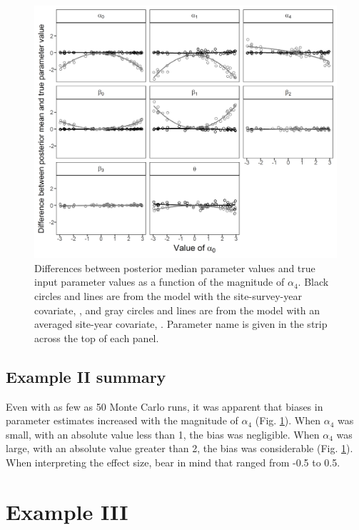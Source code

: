 \documentclass[codesnippet]{jss}
\begin{document}
\begin{figure}
\includegraphics[width=\linewidth]{fig2.png}
\caption{Differences between posterior median parameter values and true input parameter values as a function of the magnitude of $\alpha_4$. Black circles and lines are from the model with the site-survey-year covariate, , and gray circles and lines are from the model with an averaged site-year covariate, . Parameter name is given in the strip across the top of each panel.}
\label{fig:fig2}
\end{figure}

\subsection[Example II summary]{Example II summary}
Even with as few as 50 Monte Carlo runs, it was apparent that biases in parameter estimates increased with the magnitude of $\alpha_4$ (Fig. \ref{fig:fig2}). When $\alpha_4$ was small, with an absolute value less than 1, the bias was negligible. When $\alpha_4$ was large, with an absolute value greater than 2, the bias was considerable (Fig. \ref{fig:fig2}). When interpreting the effect size, bear in mind that  ranged from -0.5 to 0.5.

\section[Example III]{Example III}
\end{document}
